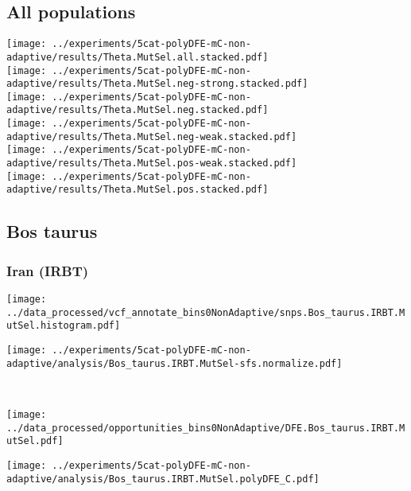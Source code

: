 \subsection{All populations}
\begin{center}
    \texttt{[image: ../experiments/5cat-polyDFE-mC-non-adaptive/results/Theta.MutSel.all.stacked.pdf]} \\
    \texttt{[image: ../experiments/5cat-polyDFE-mC-non-adaptive/results/Theta.MutSel.neg-strong.stacked.pdf]} \\
    \texttt{[image: ../experiments/5cat-polyDFE-mC-non-adaptive/results/Theta.MutSel.neg.stacked.pdf]} \\
    \texttt{[image: ../experiments/5cat-polyDFE-mC-non-adaptive/results/Theta.MutSel.neg-weak.stacked.pdf]} \\
    \texttt{[image: ../experiments/5cat-polyDFE-mC-non-adaptive/results/Theta.MutSel.pos-weak.stacked.pdf]} \\
    \texttt{[image: ../experiments/5cat-polyDFE-mC-non-adaptive/results/Theta.MutSel.pos.stacked.pdf]}

\end{center}

\subsection{Bos taurus}

\subsubsection{Iran (IRBT)}

\begin{minipage}{0.49\linewidth}
    \texttt{[image: ../data\_processed/vcf\_annotate\_bins0NonAdaptive/snps.Bos\_taurus.IRBT.MutSel.histogram.pdf]}
\end{minipage}
\begin{minipage}{0.49\linewidth}
    \texttt{[image: ../experiments/5cat-polyDFE-mC-non-adaptive/analysis/Bos\_taurus.IRBT.MutSel-sfs.normalize.pdf]}
\end{minipage}
\\
\begin{minipage}{0.49\linewidth}
    \texttt{[image: ../data\_processed/opportunities\_bins0NonAdaptive/DFE.Bos\_taurus.IRBT.MutSel.pdf]}
\end{minipage}
\begin{minipage}{0.49\linewidth}
    \texttt{[image: ../experiments/5cat-polyDFE-mC-non-adaptive/analysis/Bos\_taurus.IRBT.MutSel.polyDFE\_C.pdf]}
\end{minipage}
\\

